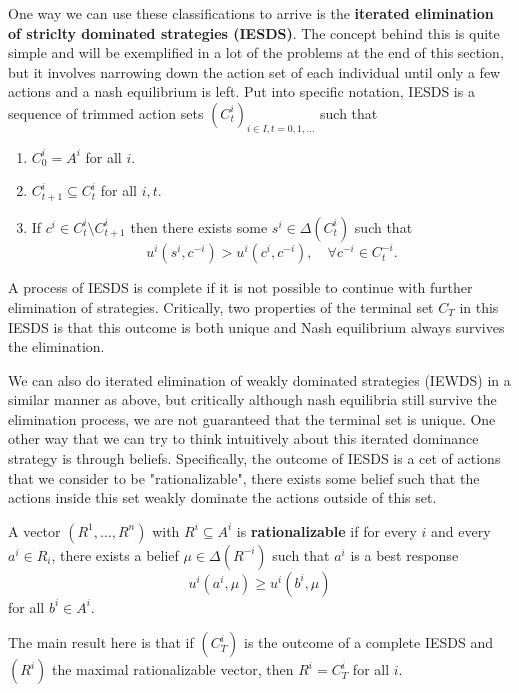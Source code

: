 \documentclass[11pt,english]{article}
\begin{document}
One way we can use these classifications to arrive is the \textbf{iterated elimination of striclty dominated strategies (IESDS)}. The concept behind this is quite simple and will be exemplified in a lot of the problems at the end of this section, but it involves narrowing down the action set of each individual until only a few actions and a nash equilibrium is left. Put into specific notation, IESDS is a sequence of trimmed action sets $(C_t^i)_{i\in I, t = 0,1,\ldots}$ such that
\begin{enumerate}
\item $C_0^i = A^i$ for all $i$.
\item $C_{t+1}^i \subseteq C_t^i$ for all $i,t$.
\item If $c^i \in C_t^i \setminus C_{t+1}^i$ then there exists some $s^i \in \Delta(C_t^i)$ such that $$u^i(s^i, c^{-i}) > u^i(c^i, c^{-i}),\quad \forall c^{-i}\in C_t^{-i}.$$
\end{enumerate}
A process of IESDS is complete if it is not possible to continue with further elimination of strategies. Critically, two properties of the terminal set $C_T$ in this IESDS is that this outcome is both unique and Nash equilibrium always survives the elimination.

We can also do iterated elimination of weakly dominated strategies (IEWDS) in a similar manner as above, but critically although nash equilibria still survive the elimination process, we are not guaranteed that the terminal set is unique. One other way that we can try to think  intuitively about this iterated dominance strategy is through beliefs. Specifically, the outcome of IESDS is a cet of actions that we consider to be "rationalizable", there exists some belief such that the actions inside this set weakly dominate the actions outside of this set.
\begin{definition}[Rationalizability]
A vector $(R^1, \ldots, R^n)$ with $R^i \subseteq A^i$ is \textbf{rationalizable} if for every $i$ and every $a^i\in R_i$, there exists a belief $\mu\in \Delta(R^{-i})$ such that $a^i$ is a best response $$u^i(a^i,\mu) \geq u^i(b^i,\mu)$$ for all $b^i\in A^i$.
\end{definition}
The main result here is that if $(C_T^i)$ is the outcome of a complete IESDS and $(R^i)$ the maximal rationalizable vector, then $R^i = C_T^i$ for all $i$.
\end{document}

